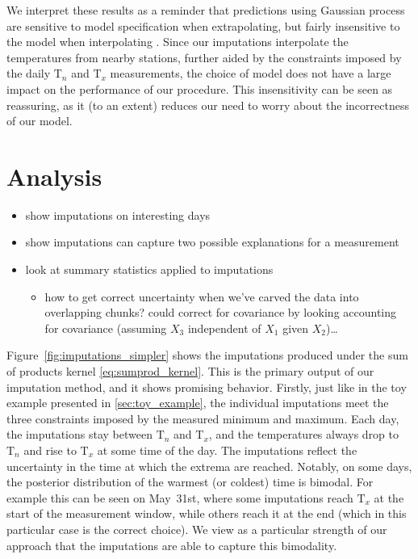\documentclass[letter]{article}
\providecommand{\tightlist}{%
      \setlength{\itemsep}{0pt}\setlength{\parskip}{0pt}}
\newcommand{\T}{\mathrm{T}}
\newcommand{\Tn}{\T_{n}}
\newcommand{\Tx}{\T_{x}}
\providecommand{\tightlist}{%
  	  \setlength{\itemsep}{0pt}\setlength{\parskip}{0pt}}
\renewcommand{\cite}[1]{\citep{#1}}
\begin{document}
We interpret these results as a reminder that predictions using Gaussian process are sensitive to model specification when extrapolating, but fairly insensitive to the model when interpolating \cite{stein2012interpolation}. Since our imputations interpolate the temperatures from nearby stations, further aided by the constraints imposed by the daily \(\Tn\) and \(\Tx\) measurements, the choice of model does not have a large impact on the performance of our procedure. This insensitivity can be seen as reassuring, as it (to an extent) reduces our need to worry about the incorrectness of our model.
    


        \section{Analysis}\label{analysis}

\begin{itemize}
\tightlist
\item
  show imputations on interesting days
\item
  show imputations can capture two possible explanations for a measurement
\item
  look at summary statistics applied to imputations

  \begin{itemize}
  \tightlist
  \item
    how to get correct uncertainty when we've carved the data into overlapping chunks? could correct for covariance by looking accounting for covariance (assuming \(X_3\) independent of \(X_1\) given \(X_2\))\ldots{}
  \end{itemize}
\end{itemize}
    


        Figure~\ref{fig:imputations_simpler} shows the imputations produced under the sum of products kernel \eqref{eq:sumprod_kernel}.
This is the primary output of our imputation method, and it shows promising behavior.
Firstly, just like in the toy example presented in \ref{sec:toy_example}, the individual imputations meet the three constraints imposed by the measured minimum and maximum.
Each day, the imputations stay between \(\Tn\) and \(\Tx\),
and the temperatures always drop to \(\Tn\) and rise to \(\Tx\) at some time of the day.
The imputations reflect the uncertainty in the time at which the extrema are reached.
Notably, on some days, the posterior distribution of the warmest (or coldest) time is bimodal.
For example this can be seen on May~31st, where some imputations reach \(\Tx\) at the start of the measurement window, while others reach it at the end (which in this particular case is the correct choice).
We view as a particular strength of our approach that the imputations are able to capture this bimodality.
    
\end{document}
